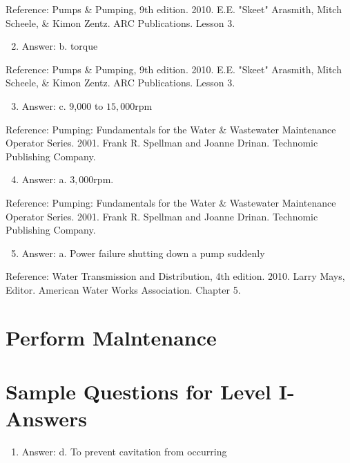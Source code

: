 \documentclass[10pt]{article}
\begin{document}
Reference: Pumps \& Pumping, 9th edition. 2010. E.E. "Skeet" Arasmith, Mitch Scheele, \& Kimon Zentz. ARC Publications. Lesson 3.

\begin{enumerate}
  \setcounter{enumi}{1}
  \item Answer: b. torque
\end{enumerate}

Reference: Pumps \& Pumping, 9th edition. 2010. E.E. "Skeet" Arasmith, Mitch Scheele, \& Kimon Zentz. ARC Publications. Lesson 3.

\begin{enumerate}
  \setcounter{enumi}{2}
  \item Answer: c. 9,000 to $15,000 \mathrm{rpm}$
\end{enumerate}

Reference: Pumping: Fundamentals for the Water \& Wastewater Maintenance Operator Series. 2001. Frank R. Spellman and Joanne Drinan. Technomic Publishing Company.

\begin{enumerate}
  \setcounter{enumi}{3}
  \item Answer: a. $3,000 \mathrm{rpm}$.
\end{enumerate}

Reference: Pumping: Fundamentals for the Water \& Wastewater Maintenance Operator Series. 2001. Frank R. Spellman and Joanne Drinan. Technomic Publishing Company.

\begin{enumerate}
  \setcounter{enumi}{4}
  \item Answer: a. Power failure shutting down a pump suddenly
\end{enumerate}

Reference: Water Transmission and Distribution, 4th edition. 2010. Larry Mays, Editor. American Water Works Association. Chapter 5.

\section{Perform Malntenance}
\section{Sample Questions for Level I-Answers}
\begin{enumerate}
  \item Answer: d. To prevent cavitation from occurring
\end{enumerate}
\end{document}
